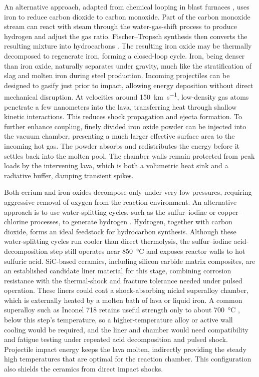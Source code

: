 \documentclass{article}
\begin{document}
An alternative approach, adapted from chemical looping in blast furnaces \cite{iron_chemical_looping}, uses iron to reduce carbon dioxide to carbon monoxide. Part of the carbon monoxide stream can react with steam through the water-gas-shift process to produce hydrogen and adjust the gas ratio. Fischer--Tropsch synthesis then converts the resulting mixture into hydrocarbons \cite{water_gas_shift,fischer_tropsch}. The resulting iron oxide may be thermally decomposed to regenerate iron, forming a closed-loop cycle. Iron, being denser than iron oxide, naturally separates under gravity, much like the stratification of slag and molten iron during steel production. Incoming projectiles can be designed to gasify just prior to impact, allowing energy deposition without direct mechanical disruption. At velocities around \SI{150}{\kilo\meter\per\second}, low-density gas atoms penetrate a few nanometers into the lava, transferring heat through shallow kinetic interactions. This reduces shock propagation and ejecta formation. To further enhance coupling, finely divided iron oxide powder can be injected into the vacuum chamber, presenting a much larger effective surface area to the incoming hot gas. The powder absorbs and redistributes the energy before it settles back into the molten pool. The chamber walls remain protected from peak loads by the intervening lava, which is both a volumetric heat sink and a radiative buffer, damping transient spikes.

Both cerium and iron oxides decompose only under very low pressures, requiring aggressive removal of oxygen from the reaction environment. An alternative approach is to use water-splitting cycles, such as the sulfur–iodine or copper–chlorine processes, to generate hydrogen \cite{sulfur_iodine_chlorine}. Hydrogen, together with carbon dioxide, forms an ideal feedstock for hydrocarbon synthesis. Although these water-splitting cycles run cooler than direct thermolysis, the sulfur--iodine acid-decomposition step still operates near \SI{850}{\celsius} and exposes reactor walls to hot sulfuric acid. SiC-based ceramics, including silicon carbide matrix composites, are an established candidate liner material for this stage, combining corrosion resistance with the thermal-shock and fracture tolerance needed under pulsed operation.  These liners could coat a shock-absorbing nickel superalloy chamber, which is externally heated by a molten bath of lava or liquid iron.  A common superalloy such as Inconel 718 retains useful strength only to about \SI{700}{\celsius} \cite{inconel_718_strong}, below this step's temperature, so a higher-temperature alloy or active wall cooling would be required, and the liner and chamber would need compatibility and fatigue testing under repeated acid decomposition and pulsed shock.  Projectile impact energy keeps the lava molten, indirectly providing the steady high temperatures that are optimal for the reaction chamber. This configuration also shields the ceramics from direct impact shocks.
\end{document}
